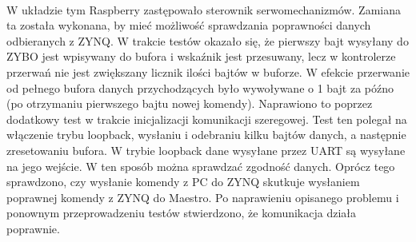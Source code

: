 \paragraph*{}
W układzie tym Raspberry zastępowało sterownik serwomechanizmów. Zamiana ta została wykonana, by mieć możliwość sprawdzania poprawności danych odbieranych z ZYNQ. W trakcie testów okazało się, że pierwszy bajt wysyłany do ZYBO jest wpisywany do bufora i wskaźnik jest przesuwany, lecz w kontrolerze przerwań nie jest zwiększany licznik ilości bajtów w buforze. W efekcie przerwanie od pełnego bufora danych przychodzących było wywoływane o 1 bajt za późno (po otrzymaniu pierwszego bajtu nowej komendy). Naprawiono to poprzez dodatkowy test w trakcie inicjalizacji komunikacji szeregowej. Test ten polegał na włączenie trybu loopback, wysłaniu i odebraniu kilku bajtów danych, a następnie zresetowaniu bufora. W trybie loopback dane wysyłane przez UART są wysyłane na jego wejście. W ten sposób można sprawdzać zgodność danych. Oprócz tego sprawdzono, czy wysłanie komendy z PC do ZYNQ skutkuje wysłaniem poprawnej komendy z ZYNQ do Maestro. Po naprawieniu opisanego problemu i ponownym przeprowadzeniu testów stwierdzono, że komunikacja działa poprawnie.